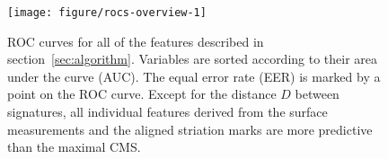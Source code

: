 \documentclass[aoas, preprint]{imsart}\usepackage[]{graphicx}\usepackage[]{color}
\newenvironment{knitrout}{}{} %
\begin{document}

\begin{figure}[hbtp]
  \centering
\begin{knitrout}
\color{fgcolor}
\texttt{[image: figure/rocs-overview-1]} 

\end{knitrout}
\caption{\label{fig:rocs}ROC curves for all of the features described in section~\ref{sec:algorithm}. Variables are sorted according to their area under the curve (AUC). The equal error rate (EER) is marked by a point on the ROC curve. Except for the distance $D$ between signatures, all individual features derived from the surface measurements and the aligned striation marks are more predictive than the maximal CMS. }
\end{figure}
\end{document}
